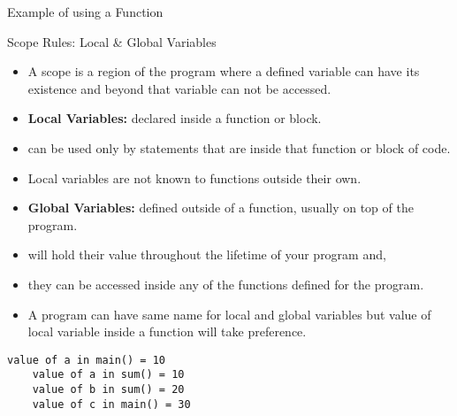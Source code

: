 \documentclass[10pt,t]{beamer}
\begin{document}
\begin{frame}{Example of using a Function}
  
\end{frame}

\begin{frame}{Scope Rules: Local \& Global Variables}
  \begin{itemize}
  \item A scope is a region of the program where a defined variable can have its existence and beyond that variable can not be accessed.
  \item \textbf{\color{lublue}Local Variables:} declared inside a function or block.
  \item[] can be used only by statements that are inside that function or block of code.
  \item[] Local variables are not known to functions outside their own.
  \item \textbf{\color{lublue}Global Variables:}  defined outside of a function, usually on top of the program.
  \item[] will hold their value throughout the lifetime of your program and,
  \item[] they can be accessed inside any of the functions defined for the program.
  \item A program can have same name for local and global variables but value of local variable inside a function will take preference.
  \end{itemize}
  
  \begin{lstlisting}[basicstyle=\fontsize{5}{6}\selectfont\ttfamily]
    value of a in main() = 10
    value of a in sum() = 10
    value of b in sum() = 20
    value of c in main() = 30
  \end{lstlisting}
\end{frame}
\end{document}
